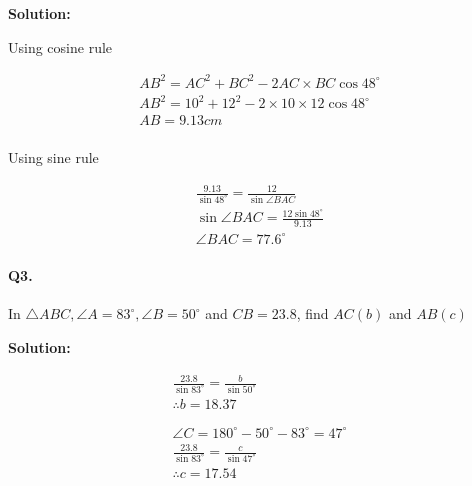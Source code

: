 \documentclass{article}
\begin{document}
{\scriptsize \textbf{Solution:}}

Using cosine rule

\[
  \begin{aligned}
    AB^{2} = AC^{2} + BC^{2} - 2AC \times BC \cos 48^{\circ} \\
    AB^{2} = 10^{2} + 12^{2} - 2 \times 10 \times 12 \cos 48^{\circ} \\
    AB = 9.13cm \\
  \end{aligned}
\]

Using sine rule

\[
  \begin{aligned}
    \frac{9.13}{\sin 48^{\circ}} = \frac{12}{\sin \angle BAC} \\
    \sin \angle BAC = \frac{12\sin 48^{\circ}}{9.13} \\
    \angle BAC = 77.6^{\circ}
  \end{aligned}
\]

\paragraph{Q3.}
In $\triangle ABC, \angle A = 83^{\circ}, \angle B= 50^{\circ}$ and $CB=23.8$, find $AC(b)$ and $AB(c)$


{\scriptsize \textbf{Solution:}}

\[
  \begin{aligned}
    \frac{23.8}{\sin 83^{\circ}} = \frac{b}{\sin 50^{\circ}} \\
    \therefore b = 18.37 \\
    \\
    \\
    \angle C = 180^{\circ}-50^{\circ}-83^{\circ}=47^{\circ} \\
    \frac{23.8}{\sin 83^{\circ}} = \frac{c}{\sin 47^{\circ}} \\
    \therefore c = 17.54
  \end{aligned}
\]
\end{document}
